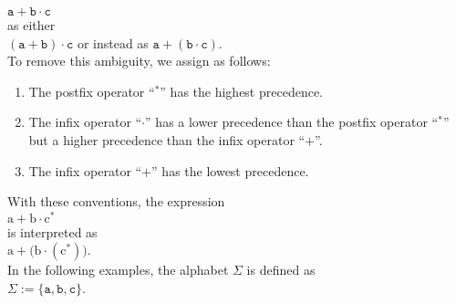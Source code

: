 $\mathtt{a} + \mathtt{b} \cdot \mathtt{c}$
\\[0.2cm]
as either 
\\[0.2cm]
\hspace*{1.3cm}
$(\mathtt{a} + \mathtt{b}) \cdot \mathtt{c}$ \quad or instead as \quad $\mathtt{a} + (\mathtt{b} \cdot \mathtt{c})$.
\\[0.2cm]
To remove this ambiguity, we assign  as follows:
\begin{enumerate}
\item The postfix operator ``$^*$'' has the highest precedence.
\item The infix operator ``$\cdot$'' has a lower precedence than the postfix operator ``$^*$'' but a higher precedence
      than the infix operator ``$+$''.
\item The infix operator ``$+$'' has the lowest precedence.
\end{enumerate}
With these conventions, the expression
\\[0.2cm]
\hspace*{1.3cm}
$\mathrm{a} + \mathrm{b} \cdot \mathrm{c}^*$
\\[0.2cm]
is interpreted as
\\[0.2cm]
\hspace*{1.3cm}
$\mathrm{a} + \bigl( \mathrm{b} \cdot (\mathrm{c}^*) \bigr)$.
\\[0.2cm]
\examplesEng
In the following examples, the alphabet $ \Sigma $ is defined as
\\[0.2cm]
\hspace*{1.3cm}
$\Sigma := \{ \texttt{a}, \texttt{b}, \texttt{c} \}$.
